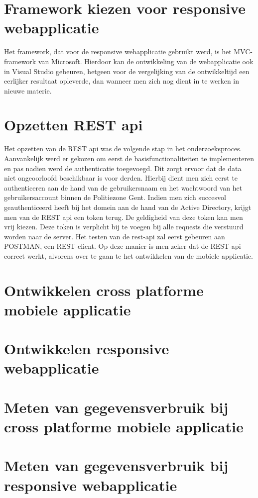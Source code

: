 \section{Framework kiezen voor responsive webapplicatie}
Het framework, dat voor de responsive webapplicatie gebruikt werd, is het MVC-framework van Microsoft.
Hierdoor kan de ontwikkeling van de webapplicatie ook in Visual Studio gebeuren, hetgeen voor de vergelijking van de ontwikkeltijd
een eerlijker resultaat opleverde, dan wanneer men zich nog dient in te werken in nieuwe materie.

\section{Opzetten REST api}
Het opzetten van de REST api was de volgende stap in het onderzoeksproces. Aanvankelijk werd er gekozen om eerst de basisfunctionaliteiten te implementeren en
pas nadien werd de authenticatie toegevoegd. Dit zorgt ervoor dat de data niet ongeoorloofd beschikbaar is voor derden.
Hierbij dient men zich eerst te authenticeren aan de hand van de gebruikersnaam en het wachtwoord van het gebruikersaccount binnen de Politiezone Gent.
Indien men zich succesvol geauthenticeerd heeft bij het domein aan de hand van de Active Directory, krijgt men van de REST api een token terug. De geldigheid van deze token kan men vrij kiezen.
Deze token is verplicht bij te voegen bij alle requests die verstuurd worden naar de server.
Het testen van de rest-api zal eerst gebeuren aan POSTMAN, een REST-client. Op deze manier is men zeker dat de REST-api correct werkt, alvorens over te gaan te het ontwikkelen van de mobiele applicatie.

\section{Ontwikkelen cross platforme mobiele applicatie}


\section{Ontwikkelen responsive webapplicatie}

\section{Meten van gegevensverbruik bij cross platforme mobiele applicatie}
\section{Meten van gegevensverbruik bij responsive webapplicatie}

